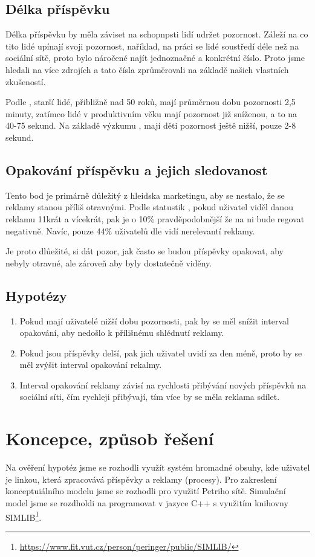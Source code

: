 \documentclass[11pt, a4paper]{article}
\begin{document}
\subsection{Délka příspěvku}
Délka příspěvku by měla záviset na schopnpsti lidí udržet pozornost. Záleží na co tito lidé upínají svoji pozornost,
naříklad, na práci se lidé soustředí déle než na sociální sítě, proto bylo náročené najít jednoznačné a konkrétní číslo.
Proto jsme hledali na více zdrojích a tato čísla zprůměrovali na základě našich vlastních zkušeností.

Podle \cite{AttentionSpan1}, starší lidé, přibližně nad 50 roků, mají průměrnou dobu pozornosti 2,5 minuty, zatímco lidé v produktivním věku mají pozornost již sníženou, a to na 40-75 sekund.
Na základě výzkumu \cite{AttentionSpan2}, mají děti pozornost ještě nižší, pouze 2-8 sekund.

\subsection{Opakování příspěvku a jejich sledovanost}
Tento bod je primárně důležitý z hleidska marketingu, aby se nestalo, že se reklamy stanou příliš otravnými.
Podle statustik \cite{SocialMediaAds}, pokud uživatel viděl danou reklamu 11krát a vícekrát, pak je o 10\% pravděpodobnější že na ni bude regovat negativně.
Navíc, pouze 44\% uživatelů dle \cite{SocialMediaAds-44} vidí nerelevantí reklamy. 

Je proto dlůežité, si dát pozor, jak často se budou příspěvky opakovat, aby nebyly otravné, ale zároveň aby byly dostatečně viděny.

\subsection{Hypotézy}
\begin{enumerate}
    \item Pokud mají uživatelé nižší dobu pozornosti, pak by se měl snížit interval opakování, aby nedošlo k přílišnému shlédnutí reklamy.
    \item Pokud jsou příspěvky delší, pak jich uživatel uvidí za den méně, proto by se měl zvýšit interval opakování rekalmy.
    \item Interval opakování reklamy závisí na rychlosti přibývání nových příspěvků na sociální síti, čím rychleji přibývají, tím více by se měla reklama sdílet.
\end{enumerate}

\newpage
\section{Koncepce, způsob řešení}
Na ověření hypotéz jsme se rozhodli využít systém hromadné obsuhy, kde uživatel je linkou, která zpracovává příspěvky a reklamy (procesy).
Pro zakreslení konceptuiálního modelu jsme se rozhodli pro využití Petriho sítě. Simulační model jsme se rozdholdi na programovat v jazyce C++ s využitím knihovny SIMLIB\footnote{\href{https://www.fit.vut.cz/person/peringer/public/SIMLIB/}{https://www.fit.vut.cz/person/peringer/public/SIMLIB/}}.
\end{document}
